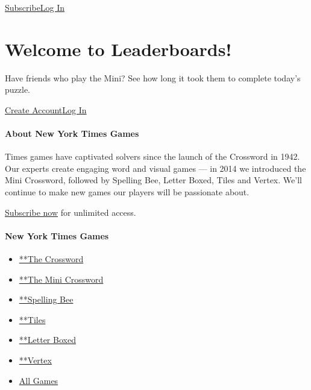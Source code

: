 \href{https://www.nytimes.com/subscription/games?campaignId=4QHQ8}{Subscribe}\href{https://myaccount.nytimes.com/auth/login?redirect_uri=https\%3A\%2F\%2Fwww.nytimes.com\%2Fpuzzles\%2Fleaderboards\&response_type=cookie\&client_id=games\&application=crosswords\&asset=navigation-bar}{Log
In}

\hypertarget{welcome-to-leaderboards}{%
\section{Welcome to Leaderboards!}\label{welcome-to-leaderboards}}

Have friends who play the Mini? See how long it took them to complete
today's puzzle.

\href{https://myaccount.nytimes.com/register?redirect_uri=https\%3A\%2F\%2Fwww.nytimes.com\%2Fpuzzles\%2Fleaderboards\&response_type=cookie\&client_id=games\&application=crosswords\&asset=leaderboard}{Create
Account}\href{https://myaccount.nytimes.com/auth/login?redirect_uri=https\%3A\%2F\%2Fwww.nytimes.com\%2Fpuzzles\%2Fleaderboards\&response_type=cookie\&client_id=games\&application=crosswords\&asset=leaderboard}{Log
In}

\hypertarget{about-new-york-times-games}{%
\paragraph{About New York Times
Games}\label{about-new-york-times-games}}

Times games have captivated solvers since the launch of the Crossword in
1942. Our experts create engaging word and visual games --- in 2014 we
introduced the Mini Crossword, followed by Spelling Bee, Letter Boxed,
Tiles and Vertex. We'll continue to make new games our players will be
passionate about.

\href{https://www.nytimes.com/subscription/games?campaignId=9W9LL}{Subscribe
now} for unlimited access.

\hypertarget{new-york-times-games-1}{%
\paragraph{New York Times Games}\label{new-york-times-games-1}}

\begin{itemize}
\tightlist
\item
  \href{/crosswords/game/daily}{**The Crossword}
\item
  \href{/crosswords/game/mini}{**The Mini Crossword}
\item
  \href{/puzzles/spelling-bee}{**Spelling Bee}
\item
  \href{/puzzles/tiles}{**Tiles}
\item
  \href{/puzzles/letter-boxed}{**Letter Boxed}
\item
  \href{/puzzles/vertex}{**Vertex}
\item
  \href{/crosswords}{All Games}
\end{itemize}

